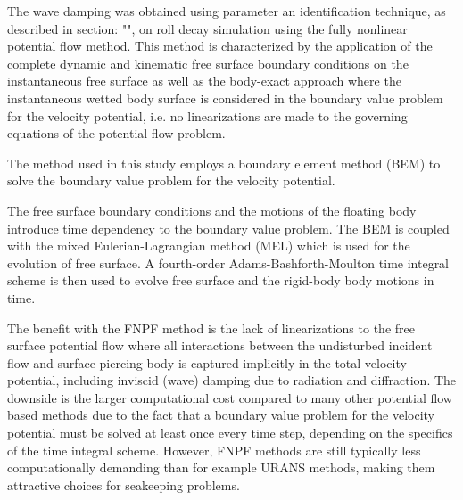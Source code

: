 \label{fnpf-method} The wave damping was obtained using parameter an
identification technique, as described in section:
"", on roll decay simulation using the fully
nonlinear potential flow method. This method is characterized by the
application of the complete dynamic and kinematic free surface boundary
conditions on the instantaneous free surface as well as the body-exact
approach where the instantaneous wetted body surface is considered in
the boundary value problem for the velocity potential, i.e. no
linearizations are made to the governing equations of the potential flow
problem.

\quad The method used in this study employs a boundary element method
(BEM) \citep{7505983/FD4N3DW2} to solve the boundary value problem for
the velocity potential.

\quad The free surface boundary conditions and the motions of the
floating body introduce time dependency to the boundary value problem.
The BEM is coupled with the mixed Eulerian-Lagrangian method (MEL)
\citep{7505983/ZKB494GT} which is used for the evolution of free surface.
A fourth-order Adams-Bashforth-Moulton time integral scheme is then used
to evolve free surface and the rigid-body body motions in time.

\quad The benefit with the FNPF method is the lack of linearizations to
the free surface potential flow where all interactions between the
undisturbed incident flow and surface piercing body is captured
implicitly in the total velocity potential, including inviscid (wave)
damping due to radiation and diffraction. The downside is the larger
computational cost compared to many other potential flow based methods
due to the fact that a boundary value problem for the velocity potential
must be solved at least once every time step, depending on the specifics
of the time integral scheme. However, FNPF methods are still typically
less computationally demanding than for example URANS methods, making
them attractive choices for seakeeping problems.

    